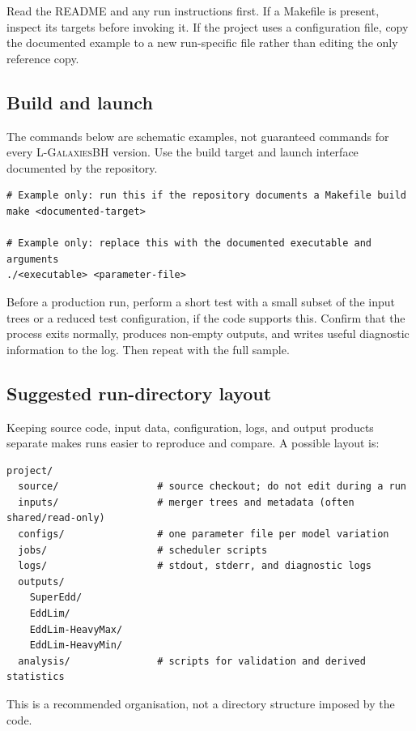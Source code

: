 \documentclass[11pt,a4paper]{article}
\newcommand{\Lgalbh}{\textsc{L-GalaxiesBH}}
\begin{document}
Read the README and any run instructions first. If a Makefile is present, inspect its targets before invoking it. If the project uses a configuration file, copy the documented example to a new run-specific file rather than editing the only reference copy.

\subsection{Build and launch}

The commands below are schematic examples, not guaranteed commands for every \Lgalbh{} version. Use the build target and launch interface documented by the repository.

\begin{lstlisting}
# Example only: run this if the repository documents a Makefile build
make <documented-target>

# Example only: replace this with the documented executable and arguments
./<executable> <parameter-file>
\end{lstlisting}

Before a production run, perform a short test with a small subset of the input trees or a reduced test configuration, if the code supports this. Confirm that the process exits normally, produces non-empty outputs, and writes useful diagnostic information to the log. Then repeat with the full sample.

\subsection{Suggested run-directory layout}

Keeping source code, input data, configuration, logs, and output products separate makes runs easier to reproduce and compare. A possible layout is:
\begin{lstlisting}
project/
  source/                 # source checkout; do not edit during a run
  inputs/                 # merger trees and metadata (often shared/read-only)
  configs/                # one parameter file per model variation
  jobs/                   # scheduler scripts
  logs/                   # stdout, stderr, and diagnostic logs
  outputs/
    SuperEdd/
    EddLim/
    EddLim-HeavyMax/
    EddLim-HeavyMin/
  analysis/               # scripts for validation and derived statistics
\end{lstlisting}

This is a recommended organisation, not a directory structure imposed by the code.
\end{document}
